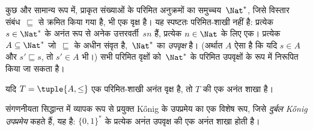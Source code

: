 \documentclass[../../../include/open-logic-section]{subfiles}
\begin{document}
\begin{ex}
कुछ और सामान्य रूप में, प्राकृत संख्याओं के परिमित अनुक्रमों का
समुच्चय~$\Nat^*$, जिसे विस्तार संबंध~$\sqsubseteq$ से क्रमित किया गया है,
भी एक वृक्ष है। यह स्पष्टतः
परिमित-शाखी नहीं है: प्रत्येक $s \in \Nat^*$ के अनंत रूप से अनेक
उत्तरवर्ती~$sn$ हैं, प्रत्येक $n \in \Nat$ के लिए एक। प्रत्येक
$A
\subseteq \Nat^*$ जो~$\sqsubseteq$ के अधीन संवृत है,~$\Nat^*$ का
\emph{उपवृक्ष} है। (अर्थात $A$ ऐसा है कि यदि $s \in A$ और
$s' \sqsubseteq s$, तो $s' \in A$ भी।) सभी परिमित वृक्षों को~$\Nat^*$ के
परिमित उपवृक्षों के रूप में निरूपित किया जा सकता है।
\end{ex}

\begin{prop}
यदि $T = \tuple{A,\le}$ एक परिमित-शाखी अनंत वृक्ष है, तो $T$ की एक अनंत
शाखा है।
\end{prop}

संगणनीयता सिद्धान्त में व्यापक रूप से प्रयुक्त K\H{o}nig के उपप्रमेय का एक
विशेष रूप, जिसे \emph{दुर्बल K\H{o}nig उपप्रमेय} कहते हैं, यह है:
$\{0,1\}^*$ के प्रत्येक अनंत उपवृक्ष की एक अनंत शाखा होती है।
\end{document}
